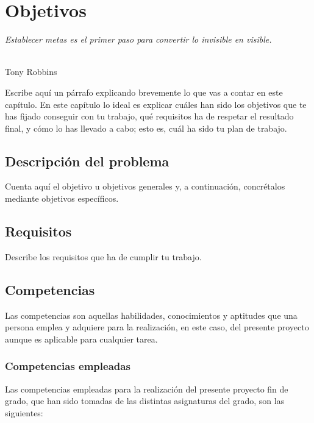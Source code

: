 \chapter{Objetivos}
\label{cap:capitulo3}

\begin{flushright}
\begin{minipage}[]{10cm}
\emph{Establecer metas es el primer paso para convertir lo invisible en visible.}\\
\end{minipage}\\

Tony Robbins\\
\end{flushright}

\vspace{1cm}

Escribe aquí un párrafo explicando brevemente lo que vas a contar en este capítulo. En este capítulo lo ideal es explicar cuáles han sido los objetivos que te has fijado conseguir con tu trabajo, qué requisitos ha de respetar el resultado final, y cómo lo has llevado a cabo; esto es, cuál ha sido tu plan de trabajo.\\

\section{Descripción del problema}
\label{sec:descripcion}

Cuenta aquí el objetivo u objetivos generales y, a continuación, concrétalos mediante objetivos específicos.

\section{Requisitos}
\label{sec:requisitos}

Describe los requisitos que ha de cumplir tu trabajo.

\section{Competencias}

Las competencias son aquellas habilidades, conocimientos y aptitudes que una persona emplea y adquiere para la realización, en este caso, del presente proyecto aunque es aplicable para cualquier tarea.
   
\subsection{Competencias empleadas}
Las competencias empleadas para la realización del presente proyecto fin de grado, que han sido tomadas de las distintas asignaturas del grado, son las siguientes: 

